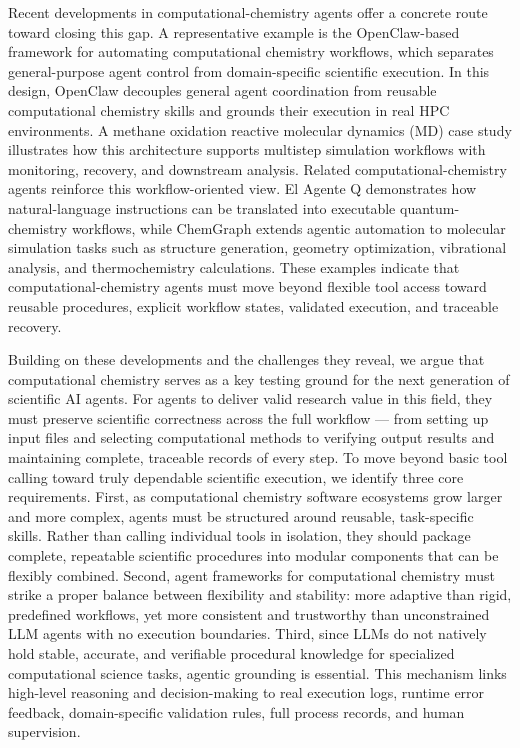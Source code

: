 \documentclass[journal=jacsat,manuscript=article]{achemso}
\begin{document}
Recent developments in computational-chemistry agents offer a concrete route toward closing this gap. A representative example is the OpenClaw-based framework for automating computational chemistry workflows, which separates general-purpose agent control from domain-specific scientific execution.\cite{dingAutomatingComputationalChemistry2026} In this design, OpenClaw decouples general agent coordination from reusable computational chemistry skills and grounds their execution in real HPC environments. A methane oxidation reactive molecular dynamics (MD) case study illustrates how this architecture supports multistep simulation workflows with monitoring, recovery, and downstream analysis. Related computational-chemistry agents reinforce this workflow-oriented view. El Agente Q demonstrates how natural-language instructions can be translated into executable quantum-chemistry workflows, while ChemGraph extends agentic automation to molecular simulation tasks such as structure generation, geometry optimization, vibrational analysis, and thermochemistry calculations.\cite{zouAgenteAutonomousAgent2025,phamChemGraphAgenticFramework2026} These examples indicate that computational-chemistry agents must move beyond flexible tool access toward reusable procedures, explicit workflow states, validated execution, and traceable recovery.

Building on these developments and the challenges they reveal, we argue that computational chemistry serves as a key testing ground for the next generation of scientific AI agents. For agents to deliver valid research value in this field, they must preserve scientific correctness across the full workflow — from setting up input files and selecting computational methods to verifying output results and maintaining complete, traceable records of every step. To move beyond basic tool calling toward truly dependable scientific execution, we identify three core requirements. First, as computational chemistry software ecosystems grow larger and more complex, agents must be structured around reusable, task-specific skills. Rather than calling individual tools in isolation, they should package complete, repeatable scientific procedures into modular components that can be flexibly combined. Second, agent frameworks for computational chemistry must strike a proper balance between flexibility and stability: more adaptive than rigid, predefined workflows, yet more consistent and trustworthy than unconstrained LLM agents with no execution boundaries. Third, since LLMs do not natively hold stable, accurate, and verifiable procedural knowledge for specialized computational science tasks, agentic grounding is essential. This mechanism links high-level reasoning and decision-making to real execution logs, runtime error feedback, domain-specific validation rules, full process records, and human supervision.
\end{document}
